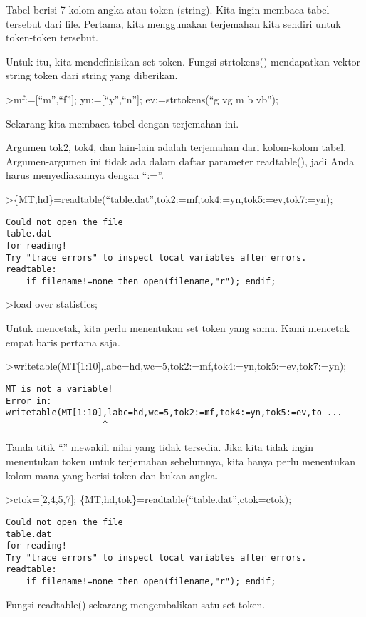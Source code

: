 \documentclass[
]{book}
\begin{document}
Tabel berisi 7 kolom angka atau token (string). Kita ingin membaca tabel tersebut dari file. Pertama, kita menggunakan terjemahan kita sendiri untuk token-token tersebut.

Untuk itu, kita mendefinisikan set token. Fungsi strtokens() mendapatkan vektor string token dari string yang diberikan.

\textgreater mf:={[}``m'',``f''{]}; yn:={[}``y'',``n''{]}; ev:=strtokens(``g vg m b vb'');

Sekarang kita membaca tabel dengan terjemahan ini.

Argumen tok2, tok4, dan lain-lain adalah terjemahan dari kolom-kolom tabel. Argumen-argumen ini tidak ada dalam daftar parameter readtable(), jadi Anda harus menyediakannya dengan ``:=''.

\textgreater\{MT,hd\}=readtable(``table.dat'',tok2:=mf,tok4:=yn,tok5:=ev,tok7:=yn);

\begin{verbatim}
Could not open the file
table.dat
for reading!
Try "trace errors" to inspect local variables after errors.
readtable:
    if filename!=none then open(filename,"r"); endif;
\end{verbatim}

\textgreater load over statistics;

Untuk mencetak, kita perlu menentukan set token yang sama. Kami mencetak empat baris pertama saja.

\textgreater writetable(MT{[}1:10{]},labc=hd,wc=5,tok2:=mf,tok4:=yn,tok5:=ev,tok7:=yn);

\begin{verbatim}
MT is not a variable!
Error in:
writetable(MT[1:10],labc=hd,wc=5,tok2:=mf,tok4:=yn,tok5:=ev,to ...
                   ^
\end{verbatim}

Tanda titik ``.'' mewakili nilai yang tidak tersedia. Jika kita tidak ingin menentukan token untuk terjemahan sebelumnya, kita hanya perlu menentukan kolom mana yang berisi token dan bukan angka.

\textgreater ctok={[}2,4,5,7{]}; \{MT,hd,tok\}=readtable(``table.dat'',ctok=ctok);

\begin{verbatim}
Could not open the file
table.dat
for reading!
Try "trace errors" to inspect local variables after errors.
readtable:
    if filename!=none then open(filename,"r"); endif;
\end{verbatim}

Fungsi readtable() sekarang mengembalikan satu set token.
\end{document}
